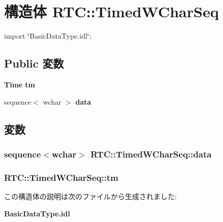 \section{構造体 RTC::TimedWCharSeq}
\label{structRTC_1_1TimedWCharSeq}


{\ttfamily import \char`\"{}BasicDataType.idl\char`\"{};}

\subsection*{Public 変数}
\begin{DoxyCompactItemize}
\item 
{\bf Time} {\bf tm}
\item 
sequence$<$ wchar $>$ {\bf data}
\end{DoxyCompactItemize}


\subsection{変数}
\subsubsection[{data}]{\setlength{\rightskip}{0pt plus 5cm}sequence$<$wchar$>$ {\bf RTC::TimedWCharSeq::data}}\label{structRTC_1_1TimedWCharSeq_a23d1cbf89923a07f543f8a69ccaad3a1}
\subsubsection[{tm}]{ {\bf RTC::TimedWCharSeq::tm}}\label{structRTC_1_1TimedWCharSeq_a408c0da590498352074ee15299200f2c}


この構造体の説明は次のファイルから生成されました:\begin{DoxyCompactItemize}
\item 
{\bf BasicDataType.idl}\end{DoxyCompactItemize}

